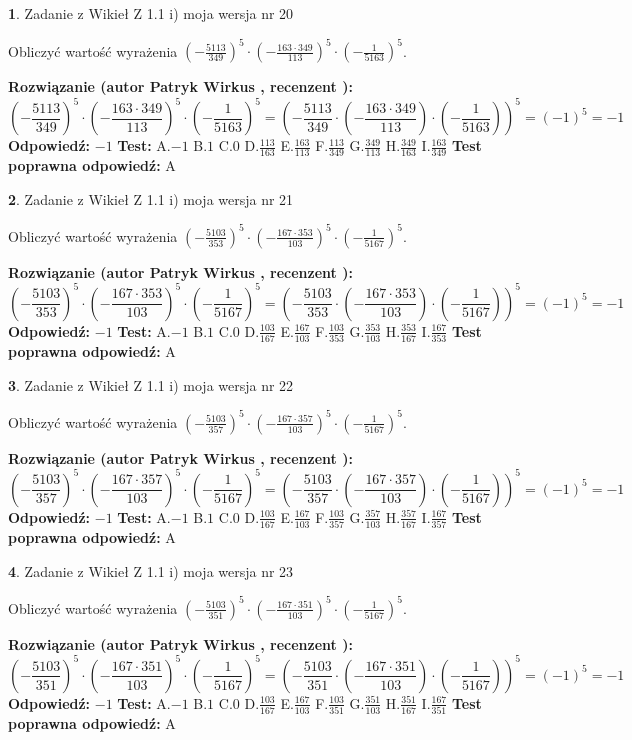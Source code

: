 \documentclass[12pt, a4paper]{article}
\theoremstyle{definition} %
\newtheorem{zad}{}
\newcommand{\zadStart}[1]{\begin{zad}#1\newline}
\newcommand{\zadStop}{\end{zad}}
\newcommand{\rozwStart}[2]{\noindent \textbf{Rozwiązanie (autor #1 , recenzent #2): }\newline}
\newcommand{\rozwStop}{\newline}
\newcommand{\odpStart}{\noindent \textbf{Odpowiedź:}\newline}
\newcommand{\odpStop}{\newline}
\newcommand{\testStart}{\noindent \textbf{Test:}\newline}
\newcommand{\testStop}{\newline}
\newcommand{\kluczStart}{\noindent \textbf{Test poprawna odpowiedź:}\newline}
\newcommand{\kluczStop}{\newline}
\begin{document}
\zadStart{Zadanie z Wikieł Z 1.1 i) moja wersja nr 20}

Obliczyć wartość wyrażenia $(-\frac{5113}{349})^{5} \cdot (-\frac{163 \cdot 349}{113})^{5} \cdot (-\frac{1}{5163})^{5}$.
\zadStop
\rozwStart{Patryk Wirkus}{}
$$(-\frac{5113}{349})^{5} \cdot (-\frac{163 \cdot 349}{113})^{5} \cdot (-\frac{1}{5163})^{5} = (-\frac{5113}{349} \cdot (-\frac{163 \cdot 349}{113}) \cdot (-\frac{1}{5163}))^{5} = (-1)^{5} = -1$$
\rozwStop
\odpStart
$-1$
\odpStop
\testStart
A.$-1$ B.$1$ C.$0$ D.$\frac{113}{163}$ E.$\frac{163}{113}$
F.$\frac{113}{349}$ G.$\frac{349}{113}$
H.$\frac{349}{163}$
I.$\frac{163}{349}$
\testStop
\kluczStart
A
\kluczStop



\zadStart{Zadanie z Wikieł Z 1.1 i) moja wersja nr 21}

Obliczyć wartość wyrażenia $(-\frac{5103}{353})^{5} \cdot (-\frac{167 \cdot 353}{103})^{5} \cdot (-\frac{1}{5167})^{5}$.
\zadStop
\rozwStart{Patryk Wirkus}{}
$$(-\frac{5103}{353})^{5} \cdot (-\frac{167 \cdot 353}{103})^{5} \cdot (-\frac{1}{5167})^{5} = (-\frac{5103}{353} \cdot (-\frac{167 \cdot 353}{103}) \cdot (-\frac{1}{5167}))^{5} = (-1)^{5} = -1$$
\rozwStop
\odpStart
$-1$
\odpStop
\testStart
A.$-1$ B.$1$ C.$0$ D.$\frac{103}{167}$ E.$\frac{167}{103}$
F.$\frac{103}{353}$ G.$\frac{353}{103}$
H.$\frac{353}{167}$
I.$\frac{167}{353}$
\testStop
\kluczStart
A
\kluczStop



\zadStart{Zadanie z Wikieł Z 1.1 i) moja wersja nr 22}

Obliczyć wartość wyrażenia $(-\frac{5103}{357})^{5} \cdot (-\frac{167 \cdot 357}{103})^{5} \cdot (-\frac{1}{5167})^{5}$.
\zadStop
\rozwStart{Patryk Wirkus}{}
$$(-\frac{5103}{357})^{5} \cdot (-\frac{167 \cdot 357}{103})^{5} \cdot (-\frac{1}{5167})^{5} = (-\frac{5103}{357} \cdot (-\frac{167 \cdot 357}{103}) \cdot (-\frac{1}{5167}))^{5} = (-1)^{5} = -1$$
\rozwStop
\odpStart
$-1$
\odpStop
\testStart
A.$-1$ B.$1$ C.$0$ D.$\frac{103}{167}$ E.$\frac{167}{103}$
F.$\frac{103}{357}$ G.$\frac{357}{103}$
H.$\frac{357}{167}$
I.$\frac{167}{357}$
\testStop
\kluczStart
A
\kluczStop



\zadStart{Zadanie z Wikieł Z 1.1 i) moja wersja nr 23}

Obliczyć wartość wyrażenia $(-\frac{5103}{351})^{5} \cdot (-\frac{167 \cdot 351}{103})^{5} \cdot (-\frac{1}{5167})^{5}$.
\zadStop
\rozwStart{Patryk Wirkus}{}
$$(-\frac{5103}{351})^{5} \cdot (-\frac{167 \cdot 351}{103})^{5} \cdot (-\frac{1}{5167})^{5} = (-\frac{5103}{351} \cdot (-\frac{167 \cdot 351}{103}) \cdot (-\frac{1}{5167}))^{5} = (-1)^{5} = -1$$
\rozwStop
\odpStart
$-1$
\odpStop
\testStart
A.$-1$ B.$1$ C.$0$ D.$\frac{103}{167}$ E.$\frac{167}{103}$
F.$\frac{103}{351}$ G.$\frac{351}{103}$
H.$\frac{351}{167}$
I.$\frac{167}{351}$
\testStop
\kluczStart
A
\kluczStop
\end{document}
